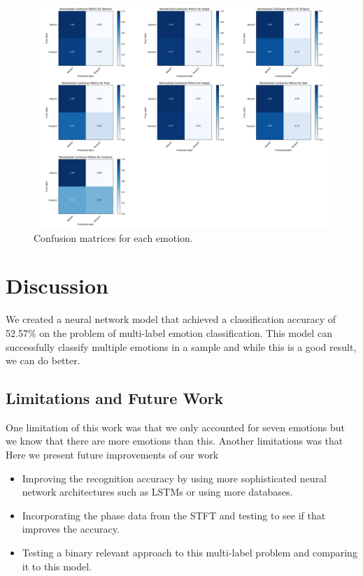 \documentclass[conference]{IEEEtran}
\begin{document}
\begin{figure}[]
	\centering
	\hspace{6mm}
	\includegraphics[width=\textwidth]{confusion_matrix.png}
	\caption{Confusion matrices for each emotion.}
	\label{fig:confusion_matrix}
\end{figure}

\section{Discussion}

We created a neural network model that achieved a classification accuracy of 52.57\% on the problem of multi-label emotion classification. This model can successfully classify multiple emotions in a sample and while this is a good result, we can do better.

\subsection{Limitations and Future Work}

One limitation of this work was that we only accounted for seven emotions but we know that there are more emotions than this. \cite{} Another limitations was that 
Here we present future improvements of our work 
\begin{itemize}
	\item Improving the recognition accuracy by using more sophisticated neural network architectures such as LSTMs or using more databases.
	\item Incorporating the phase data from the STFT and testing to see if that improves the accuracy.
	\item Testing a binary relevant approach to this multi-label problem and comparing it to this model.
\end{itemize}
\end{document}
